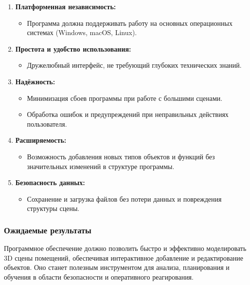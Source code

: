 \begin{enumerate}
    \item \textbf{Платформенная независимость:}
    \begin{itemize}
        \item Программа должна поддерживать работу на основных операционных системах (Windows, macOS, Linux).
    \end{itemize}
    
    \item \textbf{Простота и удобство использования:}
    \begin{itemize}
        \item Дружелюбный интерфейс, не требующий глубоких технических знаний.
    \end{itemize}
    
    \item \textbf{Надёжность:}
    \begin{itemize}
        \item Минимизация сбоев программы при работе с большими сценами.
        \item Обработка ошибок и предупреждений при неправильных действиях пользователя.
    \end{itemize}
    
    \item \textbf{Расширяемость:}
    \begin{itemize}
        \item Возможность добавления новых типов объектов и функций без значительных изменений в структуре программы.
    \end{itemize}
    
    \item \textbf{Безопасность данных:}
    \begin{itemize}
        \item Сохранение и загрузка файлов без потери данных и повреждения структуры сцены.
    \end{itemize}
\end{enumerate}

\subsubsection{Ожидаемые результаты}

\hspace{1.25cm}
Программное обеспечение должно позволить быстро и эффективно моделировать 3D сцены помещений, обеспечивая интерактивное добавление и редактирование объектов. Оно станет полезным инструментом для анализа, планирования и обучения в области безопасности и оперативного реагирования.


